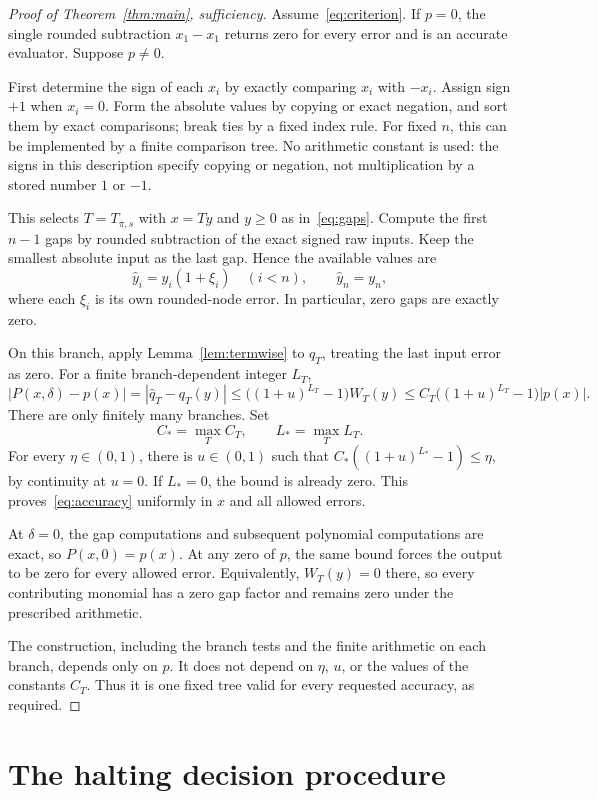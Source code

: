 \documentclass[11pt,a4paper]{article}
\numberwithin{equation}{section}
\theoremstyle{definition}
\theoremstyle{remark}
\newcommand{\abs}[1]{\left|#1\right|}
\begin{document}
\begin{proof}[Proof of Theorem~\ref{thm:main}, sufficiency]
Assume~\eqref{eq:criterion}.  If $p=0$, the single rounded subtraction
$x_1-x_1$ returns zero for every error and is an accurate evaluator.
Suppose $p\ne0$.

First determine the sign of each $x_i$ by exactly comparing $x_i$ with
$-x_i$.  Assign sign $+1$ when $x_i=0$.  Form the absolute values by
copying or exact negation, and sort them by exact comparisons; break ties
by a fixed index rule.  For fixed $n$, this can be implemented by a finite
comparison tree.  No arithmetic constant is used: the signs in this
description specify copying or negation, not multiplication by a stored
number $1$ or $-1$.

This selects $T=T_{\pi,s}$ with $x=Ty$ and $y\ge0$ as
in~\eqref{eq:gaps}.  Compute the first $n-1$ gaps by rounded subtraction
of the exact signed raw inputs.  Keep the smallest absolute input as the
last gap.  Hence the available values are
\[
 \widehat y_i=y_i(1+\xi_i)\quad(i<n),
 \qquad \widehat y_n=y_n,
\]
where each $\xi_i$ is its own rounded-node error.  In particular, zero
gaps are exactly zero.

On this branch, apply Lemma~\ref{lem:termwise} to $q_T$, treating the
last input error as zero.  For a finite branch-dependent integer $L_T$,
\[
 \abs{P(x,\delta)-p(x)}
 =\abs{\widehat q_T-q_T(y)}
 \le\bigl((1+u)^{L_T}-1\bigr)W_T(y)
 \le C_T\bigl((1+u)^{L_T}-1\bigr)\abs{p(x)}.
\]
There are only finitely many branches.  Set
\[
 C_* =\max_T C_T,\qquad L_* =\max_T L_T.
\]
For every $\eta\in(0,1)$, there is $u\in(0,1)$ such that
$C_*((1+u)^{L_*}-1)\le\eta$, by continuity at $u=0$.
If $L_*=0$, the bound is already zero.
This proves~\eqref{eq:accuracy} uniformly in $x$ and all allowed errors.

At $\delta=0$, the gap computations and subsequent polynomial
computations are exact, so $P(x,0)=p(x)$.  At any zero of $p$, the same
bound forces the output to be zero for every allowed error.  Equivalently,
$W_T(y)=0$ there, so every contributing monomial has a zero gap factor
and remains zero under the prescribed arithmetic.

The construction, including the branch tests and the finite arithmetic
on each branch, depends only on $p$.  It does not depend on $\eta$, $u$,
or the values of the constants $C_T$.  Thus it is one fixed tree valid
for every requested accuracy, as required.
\end{proof}

\section{The halting decision procedure}\label{sec:decision}
\end{document}
